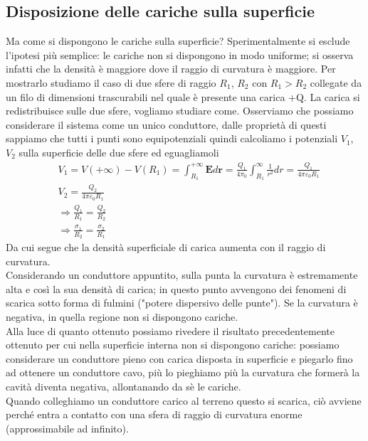 \documentclass[
10pt, %
a4paper, %
oneside, %
headinclude,footinclude, %
BCOR5mm, %
]{scrartcl}
\begin{document}
\subsection{Disposizione delle cariche sulla superficie}
Ma come si dispongono le cariche sulla superficie? Sperimentalmente si esclude l'ipotesi più semplice: le cariche non si dispongono in modo uniforme; si osserva infatti che la densità è maggiore dove il raggio di curvatura è maggiore. Per mostrarlo studiamo il caso di due sfere di raggio \(R_1\), \(R_2\) con \(R_1>R_2\) collegate da un filo di dimensioni trascurabili nel quale è presente una carica +Q. La carica si redistribuisce sulle due sfere, vogliamo studiare come. Osserviamo che possiamo considerare il sistema come un unico conduttore, dalle proprietà di questi sappiamo che tutti i punti sono equipotenziali quindi calcoliamo i potenziali \(V_1\), \(V_2\) sulla superficie delle due sfere ed eguagliamoli
\begin{align*}
	&V_1 = V(+\infty) - V(R_1) = \int_{R_1}^{+\infty} \mathbf{E}d\mathbf{r} =  \frac{Q_1}{4\pi_0}\int_{R_1}^{\infty}\frac{1}{r^2}dr = \frac{Q_1}{4\pi\varepsilon_0R_1} \\
	&V_2 = \frac{Q_2}{4\pi\varepsilon_0R_1}\\
	&\Rightarrow \frac{Q_1}{R_1}= \frac{Q_2}{R_2}\\
	&\Rightarrow \frac{\sigma_1}{R_2} = \frac{\sigma_2}{R_1}
\end{align*}
Da cui segue che la densità superficiale di carica aumenta con il raggio di curvatura.\\
Considerando un conduttore appuntito, sulla punta la curvatura è estremamente alta e così la sua densità di carica; in questo punto avvengono dei fenomeni di scarica sotto forma di fulmini ("potere dispersivo delle punte"). Se la curvatura è negativa, in quella regione non si dispongono cariche.\\
Alla luce di quanto ottenuto possiamo rivedere il risultato precedentemente ottenuto per cui nella superficie interna non si dispongono cariche: possiamo considerare un conduttore pieno con carica disposta in superficie e piegarlo fino ad ottenere un conduttore cavo, più lo pieghiamo più la curvatura che formerà la cavità diventa negativa, allontanando da sè le cariche.\\
Quando colleghiamo un conduttore carico al terreno questo si scarica, ciò avviene perché entra a contatto con una sfera di raggio di curvatura enorme (approssimabile ad infinito). 
\end{document}
